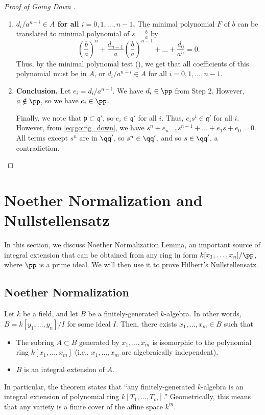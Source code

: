 \begin{proof}[Proof of Going Down ]
\begin{enumerate}
    Now, we reduce modulo $\pp$.
    We get $X^n = \overline G(X) \overline H(X)$
    in $A/\pp[x]$. Thus, $\overline G(X) = X^m$,
    so all other coefficients in $G$ vanish modulo $\pp$.
    \item \textbf{$d_i/a^{n-i} \in A$ for all $i=0,1,\dots,n-1$.}
    The minimal polynomial $F$ of $b$ can be translated
    to minimal polynomial of $s=\frac ba$ by
    \begin{equation}
    \label{eq:going_down}
    \left(\frac ba\right)^n
    + \frac{d_{n-1}}a \left(\frac ba\right)^{n-1}
    + \dots + \frac{d_0}{a^n} = 0.
    \end{equation}
    Thus, by the minimal polynomal test (), we get that
    all coefficients of this polynomial must be in $A$, or
    $d_i/a^{n-i}\in A$ for all $i=0,1,\dots,n-1$.
    \item \textbf{Conclusion.}
    Let $e_i = d_i/a^{n-i}$.
    We have $d_i\in\pp$ from Step 2.
    However, $a\notin\pp$, so we have $e_i\in\pp$.
    
    Finally, we note that $\mathfrak p\subset\mathfrak q'$,
    so $e_i\in\mathfrak q'$ for all $i$.
    Thus, $e_is^i\in\mathfrak q'$ for all $i$.
    However, from \eqref{eq:going_down},
    we have $s^n+e_{n-1}s^{n-1}+\dots+e_1s+e_0=0$.
    All terms except $s^n$ are in $\qq'$, so $s^n\in\qq'$,
    and so $s\in\qq'$, a contradiction.
    \qedhere
\end{enumerate}
\end{proof}
%
%
%
%
%
\section{Noether Normalization and Nullstellensatz}
In this section, we discuss Noether Normalization Lemma,
an important source of integral extension that
can be obtained from any ring in form $k[x_1,\dots,x_n]/\pp$,
where $\pp$ is a prime ideal.
We will then use it to prove Hilbert's Nullstellensatz.
\subsection{Noether Normalization}
\begin{theorem}
    \label{thm:noether_normalization}
    Let $k$ be a field, and let $B$ be a
    finitely-generated $k$-algebra.
    In other words, $B=k[y_1,\dots,y_n]/I$
    for some ideal $I$.
    Then, there exists $x_1,\dots,x_m\in B$ such that
    \begin{itemize}
    \item The subring $A\subset B$ generated by
    $x_1,\dots,x_m$ is isomorphic to the polynomial ring
    $k[x_1,\dots,x_m]$
    (i.e., $x_1,\dots,x_m$ are algebraically independent).
    \item $B$ is an integral extension of $A$.
    \end{itemize}
\end{theorem}
In particular, the theorem states that ``any finitely-generated $k$-algebra is an integral extension of polynomial ring
$k[T_1,\dots,T_m]$.''
Geometrically, this means that any variety is 
a finite cover of the affine space $k^m$.

